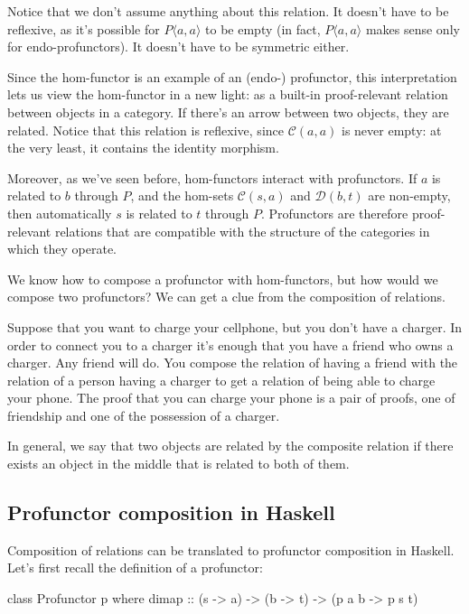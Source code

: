 \documentclass[DaoFP]{subfiles}
\begin{document}
Notice that we don't assume anything about this relation. It doesn't have to be reflexive, as it's possible for $P \langle a, a \rangle$ to be empty (in fact, $P \langle a, a \rangle$ makes sense only for endo-profunctors). It doesn't have to be symmetric either.

Since the hom-functor is an example of an (endo-) profunctor, this interpretation lets us view the hom-functor in a new light: as a built-in proof-relevant relation between objects in a category. If there's an arrow between two objects, they are related. Notice that this relation is reflexive, since $\mathcal{C}(a, a)$ is never empty: at the very least, it contains the identity morphism. 

Moreover, as we've seen before, hom-functors interact with profunctors. If $a$ is related to $b$ through $P$, and the hom-sets $\mathcal{C}(s, a)$ and $\mathcal{D}(b, t)$ are non-empty, then automatically $s$ is related to $t$ through $P$. Profunctors are therefore proof-relevant relations that are compatible with the structure of the categories in which they operate.

We know how to compose a profunctor with hom-functors, but how would we compose two profunctors? We can get a clue from the composition of relations. 

Suppose that you want to charge your cellphone, but you don't have a charger. In order to connect you to a charger it's enough that you have a friend who owns a charger. Any friend will do. You compose the relation of having a friend with the relation of a person having a charger to get a relation of being able to charge your phone. The proof that you can charge your phone is a pair of proofs, one of friendship and one of the possession of a charger. 

In general, we say that two objects are related by the composite relation if there exists an object in the middle that is related to both of them. 

\subsection{Profunctor composition in Haskell}

Composition of relations can be translated to profunctor composition in Haskell. Let's first recall the definition of a profunctor:
\begin{haskell}
class Profunctor p where
  dimap :: (s -> a) -> (b -> t) -> (p a b -> p s t)
\end{haskell}
\end{document}
